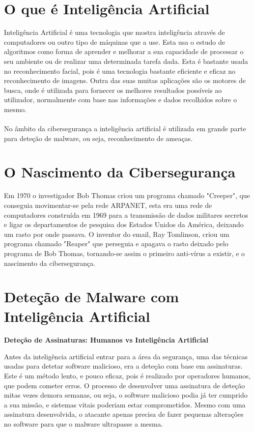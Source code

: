 \documentclass[11pt]{article}
\begin{document}
\section*{O que é Inteligência Artificial}
Inteligência Artificial é uma tecnologia que mostra inteligência através de computadores ou outro tipo de máquinas que a use. Esta usa o estudo de algoritmos como forma de aprender e melhorar a sua capacidade de processar o seu ambiente ou de realizar uma determinada tarefa dada. Esta é bastante usada no reconhecimento facial, pois é uma tecnologia bastante eficiente e eficaz no reconhecimento de imagens. Outra das suas muitas aplicações são os motores de busca, onde é utilizada para fornecer os melhores resultados possíveis ao utilizador, normalmente com base nas informações e dados recolhidos sobre o mesmo.
\paragraph{}
No âmbito da cibersegurança a inteligência artificial é utilizada em grande parte para deteção de malware, ou seja, reconhecimento de ameaças.\cite{13}

\section*{O Nascimento da Cibersegurança}
Em 1970 o investigador Bob Thomas criou um programa chamado "Creeper", que conseguia movimentar-se pela rede ARPANET, esta era uma rede de computadores construída em 1969 para a transmissão de dados militares secretos e ligar os departamentos de pesquisa dos Estados Unidos da América, deixando um rasto por onde passava. O inventor do email, Ray Tomlinson, criou um programa chamado "Reaper" que perseguia e apagava o rasto deixado pelo programa de Bob Thomas, tornando-se assim o primeiro anti-vírus a existir, e o nascimento da cibersegurança.\cite{14}\cite{15}

\section*{Deteção de Malware com Inteligência Artificial}
\paragraph{}
\textbf{Deteção de Assinaturas: Humanos vs Inteligência Artificial}

Antes da inteligência artificial entrar para a área da segurança, uma das técnicas usadas para detetar software malicioso, era a deteção com base em assinaturas. Este é um método lento, e pouco eficaz, pois é realizado por operadores humanos, que podem cometer erros. O processo de desenvolver uma assinatura de deteção mitas vezes demora semanas, ou seja, o software malicioso podia já ter cumprido a sua missão, e sistemas vitais poderiam estar comprometidos. Mesmo com uma assinatura desenvolvida, o atacante apenas precisa de fazer pequenas alterações no software para que o malware ultrapasse a mesma.
\end{document}
